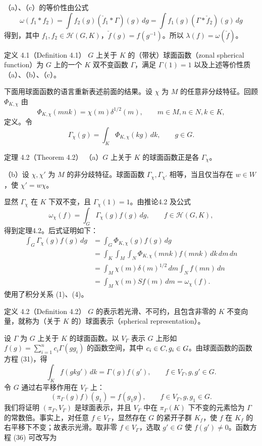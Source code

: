 （a）、（c）的等价性由公式
\[
\omega(f_1*f_2)=\int f_2(g)(\check f_1*\Gamma)(g)\,dg
=\int f_1(g)(\Gamma*\check f_2)(g)\,dg
\]
得到，其中 $f_1,f_2\in\mathcal H(G,K)$，$\check f(g)=f(g^{-1})$。所以 $\lambda(f)=\omega(\check f)$。
\begin{originaltheorem}{定义 4.1（Definition 4.1）}
$G$ 上关于 $K$ 的（带状）球面函数（zonal spherical function）为 $G$ 上的一个 $K$ 双不变函数 $\Gamma$，满足 $\Gamma(1)=1$ 以及上述等价性质（a）、（b）、（c）。
\end{originaltheorem}
下面用球面函数的语言重新表述前面的结果。设 $\chi$ 为 $M$ 的任意非分歧特征。回顾 $\Phi_{K,\chi}$ 由
\[
\Phi_{K,\chi}(mnk)=\chi(m)\delta^{1/2}(m),\qquad m\in M,n\in N,k\in K,\tag{33}
\]
定义。令
\[
\Gamma_\chi(g)=\int_K\Phi_{K,\chi}(kg)\,dk,\qquad g\in G.\tag{34}
\]
\begin{originaltheorem}{定理 4.2（Theorem 4.2）}
（a）$G$ 上关于 $K$ 的球面函数正是各 $\Gamma_\chi$。

（b）设 $\chi,\chi'$ 为 $M$ 的非分歧特征。球面函数 $\Gamma_\chi,\Gamma_{\chi'}$ 相等，当且仅当存在 $w\in W$，使 $\chi'=w\chi$。
\end{originaltheorem}
显然 $\Gamma_\chi$ 在 $K$ 下双不变，且 $\Gamma_\chi(1)=1$。由推论4.2 及公式
\[
\omega_\chi(f)=\int_G\Gamma_\chi(g)f(g)\,dg,\qquad f\in\mathcal H(G,K),\tag{35}
\]
得到定理4.2。后式证明如下：
\[
\begin{aligned}
\int_G\Gamma_\chi(g)f(g)\,dg
&=\int_G\Phi_{K,\chi}(g)f(g)\,dg\\
&=\int_K\int_M\int_N\Phi_{K,\chi}(mnk)f(mnk)\,dk\,dm\,dn\\
&=\int_M\chi(m)\delta(m)^{1/2}\,dm\int_Nf(mn)\,dn\\
&=\int_M\chi(m)Sf(m)\,dm=\omega_\chi(f).
\end{aligned}
\]
使用了积分关系 (1)、(4)。
\begin{originaltheorem}{定义 4.2（Definition 4.2）}
$G$ 的表示若光滑、不可约，且包含非零的 $K$ 不变向量，就称为（关于 $K$ 的）球面表示（spherical representation）。
\end{originaltheorem}
设 $\Gamma$ 为 $G$ 上关于 $K$ 的球面函数。以 $V_\Gamma$ 表示 $G$ 上形如 $f(g)=\sum_{i=1}^n c_i\Gamma(gg_i)$ 的函数空间，其中 $c_i\in C,g_i\in G$。由球面函数的函数方程 (31)，得
\[
\int_Kf(gkg')\,dk=\Gamma(g)f(g'),\qquad f\in V_\Gamma,g,g'\in G.\tag{36}
\]
令 $G$ 通过右平移作用在 $V_\Gamma$ 上：
\[
(\pi_\Gamma(g)f)(g_1)=f(g_1g),\qquad f\in V_\Gamma,g,g_1\in G.\tag{37}
\]
我们将证明 $(\pi_\Gamma,V_\Gamma)$ 是球面表示，并且 $V_\Gamma$ 中在 $\pi_\Gamma(K)$ 下不变的元素恰为 $\Gamma$ 的常数倍。事实上，对任意 $f\in V_\Gamma$，显然存在 $G$ 的紧开子群 $K_f$，使 $f$ 在 $K_f$ 的右平移下不变；故表示光滑。取非零 $f\in V_\Gamma$，选取 $g'\in G$ 使 $f(g')\ne0$。函数方程 (36) 可改写为
